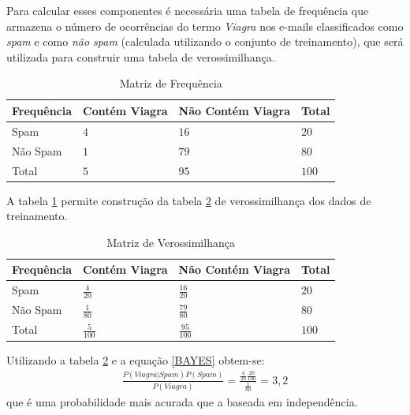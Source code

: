 Para calcular esses componentes é necessária uma tabela de frequência que armazena o número de ocorrências do termo \emph{Viagra} nos e-mails classificados como \emph{spam} e como \emph{não spam} (calculada utilizando o conjunto de treinamento), que será utilizada para construir uma tabela de verossimilhança.
\begin{table}[htbp]
	\centering
	\caption{Matriz de Frequência}
		\begin{tabular}{llll} \hline

		Frequência	& Contém Viagra	& Não Contém Viagra	& Total   \\ \hline
		Spam		& \(4\) 		& \(16\)			& \(20\)  \\ 
		Não Spam	& \(1\) 		& \(79\)			& \(80\)  \\ 
		Total		& \(5\) 		& \(95\)			& \(100\) \\ \hline
		
		\end{tabular}
	\label{tab:ExemploDeTabela1}
	\vspace{0.1cm}
\end{table}
A tabela \ref{tab:ExemploDeTabela1} permite construção da tabela \ref{tab:ExemploDeTabela2} de verossimilhança dos dados de treinamento.
\bgroup
\def\arraystretch{1.5}
\begin{table}[htbp]
	\centering
	\caption{Matriz de Verossimilhança}
		\begin{tabular}{llll} \hline

		Frequência	& Contém Viagra		& Não Contém Viagra	& Total   \\ \hline
		Spam		& \(\frac{4}{20}\) 	& \(\frac{16}{20}\)	& \(20\)  \\ 
		Não Spam	& \(\frac{1}{80}\) 	& \(\frac{79}{80}\)	& \(80\)  \\ 
		Total		& \(\frac{5}{100}\) & \(\frac{95}{100}\)& \(100\) \\ \hline
		
		\end{tabular}
	\label{tab:ExemploDeTabela2}
	\vspace{0.1cm}
\end{table}
\egroup
Utilizando a tabela \ref{tab:ExemploDeTabela2} e a equação \eqref{BAYES} obtem-se:
\begin{align}
\frac{P(Viagra|Spam)P(Spam)}{P(Viagra)} = \frac{\frac{4}{20} \frac{20}{100}}{\frac{1}{80}} = 3,2
\end{align}
que é uma probabilidade mais acurada que a baseada em independência.

